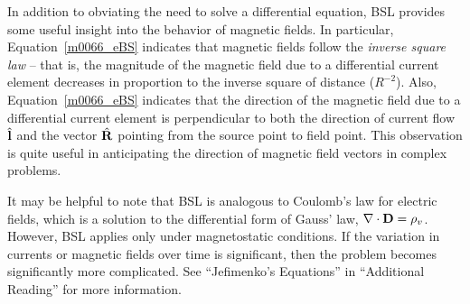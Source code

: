 In addition to obviating the need to solve a differential equation, BSL provides some useful insight into the behavior of magnetic fields.
In particular, Equation~\ref{m0066_eBS} indicates that magnetic fields follow the \emph{inverse square law}
-- that is, the magnitude of the magnetic field due to a differential current element decreases in proportion to the inverse square of distance ($R^{-2}$).
Also, Equation~\ref{m0066_eBS} indicates that the direction of the magnetic field due to a differential current element is perpendicular to both the direction of current flow $\hat{\bf l}$ and the vector $\hat{\bf R}$ pointing from the source point to field point. 
This observation is quite useful in anticipating the direction of magnetic field vectors in complex problems.
 
It may be helpful to note that BSL is analogous to Coulomb's law
for electric fields, which is a solution to the differential form of Gauss' law, $\nabla \cdot {\bf D} = \rho_v$.
However, BSL applies only under magnetostatic conditions.  If the variation in currents or magnetic fields over time is significant, then the problem becomes significantly more complicated.  See ``Jefimenko's Equations'' 
in ``Additional Reading'' for more information.

